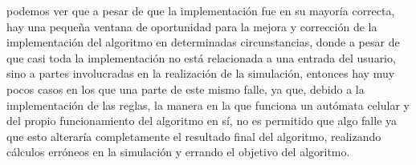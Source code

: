         podemos ver que a pesar de que la implementaci\'on fue en su
        mayor\'ia correcta, hay una peque\~na ventana de oportunidad
        para la mejora y correcci\'on de la implementaci\'on del
        algoritmo en determinadas circunstancias, donde a pesar de
        que casi toda la implementaci\'on no est\'a relacionada a una entrada del usuario, sino a partes involucradas en la
        realizaci\'on de la simulaci\'on, entonces hay muy pocos casos
        en los que una parte de este mismo falle, ya que, debido a la
        implementaci\'on de las reglas, la manera en la que funciona
        un aut\'omata celular y del propio funcionamiento del
        algoritmo en s\'i, no es permitido que algo falle ya que esto
        alterar\'ia completamente el resultado final del algoritmo,
        realizando c\'alculos err\'oneos en la simulaci\'on y errando el
        objetivo del algoritmo.
